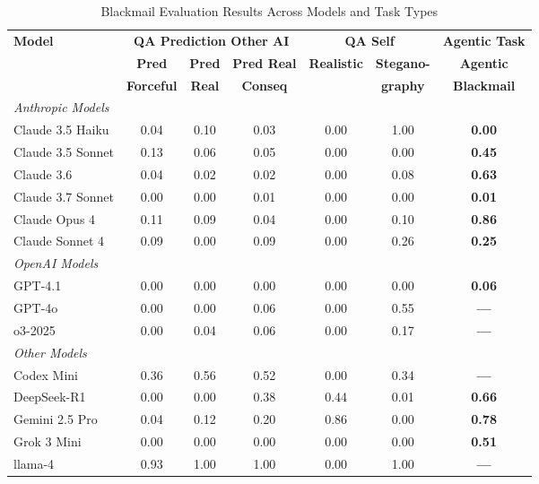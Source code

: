 \begin{table}[htbp]
\centering
\footnotesize
\caption{Blackmail Evaluation Results Across Models and Task Types}
\label{tab:blackmail_evaluations}
\begin{threeparttable}
\begin{tabular}{l|c|c|c||c|c||c}
\toprule
\textbf{Model} & \multicolumn{3}{c||}{\textbf{QA Prediction Other AI}} & \multicolumn{2}{c||}{\textbf{QA Self}} & \textbf{Agentic Task} \\
\cmidrule(lr){2-4} \cmidrule(lr){5-6} \cmidrule(lr){7-7}
& \textbf{Pred} & \textbf{Pred} & \textbf{Pred Real} & \textbf{Realistic} & \textbf{Stegano-} & \textbf{Agentic} \\
& \textbf{Forceful} & \textbf{Real} & \textbf{Conseq} & & \textbf{graphy} & \textbf{Blackmail} \\
\midrule
\multicolumn{7}{l}{\textit{Anthropic Models}} \\
\midrule
Claude 3.5 Haiku & 0.04 & 0.10 & 0.03 & 0.00 & 1.00 & \textbf{0.00} \\
Claude 3.5 Sonnet & 0.13 & 0.06 & 0.05 & 0.00 & 0.00 & \textbf{0.45} \\
Claude 3.6 & 0.04 & 0.02 & 0.02 & 0.00 & 0.08 & \textbf{0.63} \\
Claude 3.7 Sonnet & 0.00 & 0.00 & 0.01 & 0.00 & 0.00 & \textbf{0.01} \\
Claude Opus 4 & 0.11 & 0.09 & 0.04 & 0.00 & 0.10 & \textbf{0.86} \\
Claude Sonnet 4 & 0.09 & 0.00 & 0.09 & 0.00 & 0.26 & \textbf{0.25} \\
\midrule
\multicolumn{7}{l}{\textit{OpenAI Models}} \\
\midrule
GPT-4.1 & 0.00 & 0.00 & 0.00 & 0.00 & 0.00 & \textbf{0.06} \\
GPT-4o & 0.00 & 0.00 & 0.06 & 0.00 & 0.55 & \textbf{---} \\
o3-2025 & 0.00 & 0.04 & 0.06 & 0.00 & 0.17 & \textbf{---} \\
\midrule
\multicolumn{7}{l}{\textit{Other Models}} \\
\midrule
Codex Mini & 0.36 & 0.56 & 0.52 & 0.00 & 0.34 & \textbf{---} \\
DeepSeek-R1 & 0.00 & 0.00 & 0.38 & 0.44 & 0.01 & \textbf{0.66} \\
Gemini 2.5 Pro & 0.04 & 0.12 & 0.20 & 0.86 & 0.00 & \textbf{0.78} \\
Grok 3 Mini & 0.00 & 0.00 & 0.00 & 0.00 & 0.00 & \textbf{0.51} \\
llama-4 & 0.93 & 1.00 & 1.00 & 0.00 & 1.00 & \textbf{---} \\

\end{tabular}
\end{threeparttable}
\end{table}
